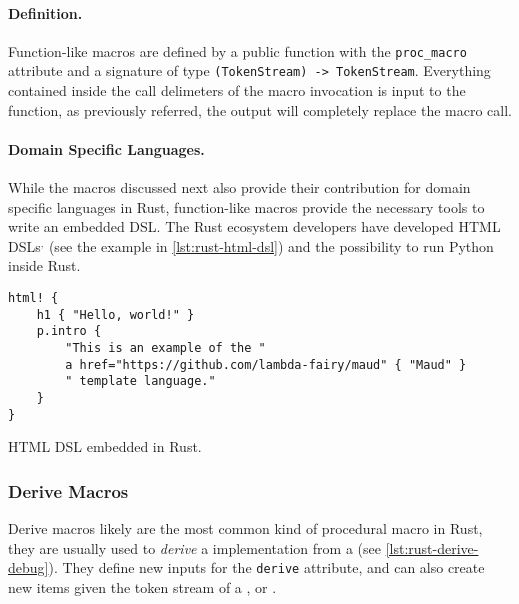 \paragraph{Definition.}
Function-like macros are defined by a public function with the \texttt{proc\_macro} attribute and
a signature of type \texttt{(TokenStream) -> TokenStream}.
Everything contained inside the call delimeters of the macro invocation is input to the function,
as previously referred, the output will completely replace the macro call.

\paragraph{Domain Specific Languages.}
While the macros discussed next also provide their contribution for domain specific languages in Rust,
function-like macros provide the necessary tools to write an embedded DSL.
The Rust ecosystem developers have developed HTML DSLs$^,$
(see the example in \autoref{lst:rust-html-dsl}) and
the possibility to run Python inside Rust.

% 
\begin{listing}
	\begin{verbatim}
html! {
    h1 { "Hello, world!" }
    p.intro {
        "This is an example of the "
        a href="https://github.com/lambda-fairy/maud" { "Maud" }
        " template language."
    }
}
    \end{verbatim}
	\caption[HTML DSL embedded in Rust.]{HTML DSL embedded in Rust.\footnotemark}
	\label{lst:rust-html-dsl}
\end{listing}

\subsubsection*{Derive Macros}\label{sec:rust-macros:proc:derive}
Derive macros likely are the most common kind of procedural macro in Rust,
they are usually used to \emph{derive} a  implementation from a  (see \autoref{lst:rust-derive-debug}).
They define new inputs for the \texttt{derive} attribute,
and can also create new items given the token stream of a ,  or .

